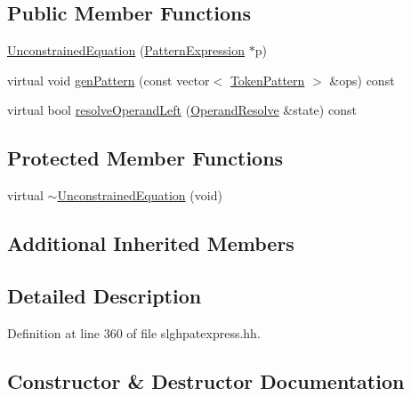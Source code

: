 \subsection*{Public Member Functions}
\begin{DoxyCompactItemize}
\item 
\mbox{\hyperlink{class_unconstrained_equation_ade67efa8c6d6a3551ae0df0b3c8bf92e}{Unconstrained\+Equation}} (\mbox{\hyperlink{class_pattern_expression}{Pattern\+Expression}} $\ast$p)
\item 
virtual void \mbox{\hyperlink{class_unconstrained_equation_a6b6c824615f9de7fba284e940cb11299}{gen\+Pattern}} (const vector$<$ \mbox{\hyperlink{class_token_pattern}{Token\+Pattern}} $>$ \&ops) const
\item 
virtual bool \mbox{\hyperlink{class_unconstrained_equation_a9970189fd95bdb8ce0c30da626124510}{resolve\+Operand\+Left}} (\mbox{\hyperlink{struct_operand_resolve}{Operand\+Resolve}} \&state) const
\end{DoxyCompactItemize}
\subsection*{Protected Member Functions}
\begin{DoxyCompactItemize}
\item 
virtual \mbox{\hyperlink{class_unconstrained_equation_af2efed5615ce066abd03825fc44aa209}{$\sim$\+Unconstrained\+Equation}} (void)
\end{DoxyCompactItemize}
\subsection*{Additional Inherited Members}


\subsection{Detailed Description}


Definition at line 360 of file slghpatexpress.\+hh.



\subsection{Constructor \& Destructor Documentation}
\mbox{\label{class_unconstrained_equation_af2efed5615ce066abd03825fc44aa209}} 

